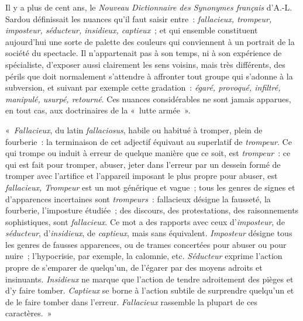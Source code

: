 \documentclass[french,twoside]{book} %
\def\mednobreak{\ifdim\lastskip<\medskipamount
  \removelastskip\nopagebreak\medskip\fi}
\newcommand{\labelblock}[1]{\medbreak{\noindent\color{rubric}\bfseries #1}\par\mednobreak}
\begin{document}
\labelblock{XV}

\noindent Il y a plus de cent ans, le \emph{Nouveau Dictionnaire des Synonymes français} d’A.-L. Sardou définissait les nuances qu’il faut saisir entre : \emph{fallacieux, trompeur, imposteur, séducteur, insidieux, captieux} ; et qui ensemble constituent aujourd’hui une sorte de palette des couleurs qui conviennent à un portrait de la société du spectacle. Il n’appartenait pas à son temps, ni à son expérience de spécialiste, d’exposer aussi clairement les sens voisins, mais très différents, des périls que doit normalement s’attendre à affronter tout groupe qui s’adonne à la subversion, et suivant par exemple cette gradation : \emph{égaré, provoqué, infiltré, manipulé, usurpé, retourné}. Ces nuances considérables ne sont jamais apparues, en tout cas, aux doctrinaires de la « lutte armée ».\par
« \emph{Fallacieux}, du latin \emph{fallaciosus}, habile ou habitué à tromper, plein de fourberie : la terminaison de cet adjectif équivaut au superlatif de \emph{trompeur}. Ce qui trompe ou induit à erreur de quelque manière que ce soit, est \emph{trompeur} : ce qui est fait pour tromper, abuser, jeter dans l’erreur par un dessein formé de tromper avec l’artifice et l’appareil imposant le plus propre pour abuser, est \emph{fallacieux, Trompeur} est un mot générique et vague ; tous les genres de signes et d’apparences incertaines sont \emph{trompeurs} : fallacieux désigne la fausseté, la fourberie, l’imposture étudiée ; des discours, des protestations, des raisonnements sophistiques, sont \emph{fallacieux}. Ce mot a des rapports avec ceux d’\emph{imposteur}, de \emph{séducteur}, d’\emph{insidieux}, de \emph{captieux}, mais sans équivalent. \emph{Imposteur} désigne tous les genres de fausses apparences, ou de trames concertées pour abuser ou pour nuire ; l’hypocrisie, par exemple, la calomnie, etc. \emph{Séducteur} exprime l’action propre de s’emparer de quelqu’un, de l’égarer par des moyens adroits et insinuants. \emph{Insidieux} ne marque que l’action de tendre adroitement des pièges et d’y faire tomber. \emph{Captieux} se borne à l’action subtile de surprendre quelqu’un et de le faire tomber dans l’erreur. \emph{Fallacieux} rassemble la plupart de ces caractères. »\par

\labelblock{XVI}
\end{document}
